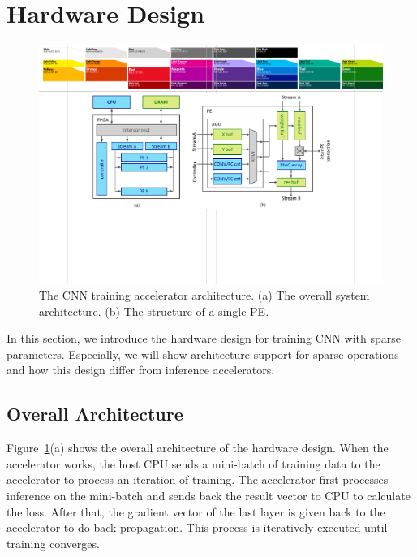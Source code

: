 \section{Hardware Design}\label{sec:hw}

\begin{figure}[t]
  \centering
  \includegraphics[width=2\columnwidth]{figures/hardware.pdf}
  \caption{The CNN training accelerator architecture. (a) The overall system architecture. (b) The structure of a single PE. }
  \label{fig:arch}
\end{figure}

In this section, we introduce the hardware design for training CNN with sparse parameters. Especially, we will show architecture support for sparse operations and how this design differ from inference accelerators.

\subsection{Overall Architecture}
Figure~\ref{fig:arch}(a) shows the overall architecture of the hardware design. 
When the accelerator works, the host CPU sends a mini-batch of training data to the accelerator to process an iteration of training. The accelerator first processes inference on the mini-batch and sends back the result vector to CPU to calculate the loss. After that, the gradient vector of the last layer is given back to the accelerator to do back propagation. This process
 is iteratively executed until training converges.

